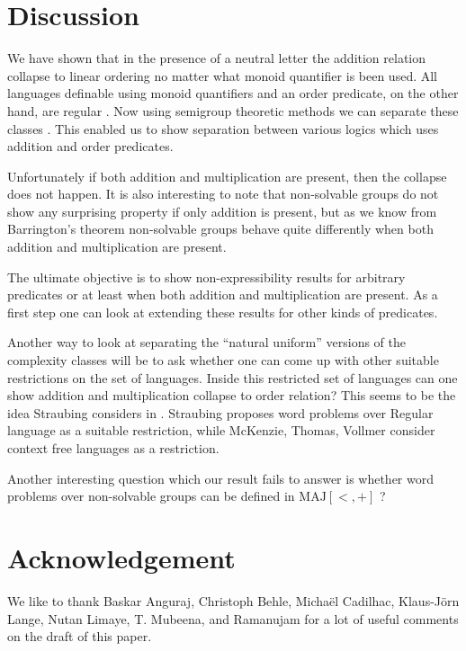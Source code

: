 \documentclass[envcountsame]{llncs}
\newcommand{\MAJ}{\mathrm{MAJ}}
\begin{document}
\bigskip


\bigskip
\section{Discussion}
We have shown that in the presence of a neutral letter the addition relation collapse to linear ordering no matter what monoid
quantifier is been used. All languages definable using monoid quantifiers and an order predicate, on the other hand, are regular \cite{barr_uniformNC1}. 
Now using semigroup theoretic methods we can separate these classes \cite{str_cirBook}. This enabled us to show separation between
various logics which uses addition and order predicates. 


Unfortunately if both addition and multiplication are present, then the collapse does not happen. It is also interesting to note that non-solvable
groups do not show any surprising property if only addition is present, but as we know from Barrington's theorem non-solvable groups
behave quite differently when both addition and multiplication are present.

The ultimate objective is to show non-expressibility results for arbitrary predicates or at least when both addition and multiplication
are present. As a first step one can look at extending these results for other kinds of predicates. 

Another way to look at separating the ``natural uniform'' versions of the complexity classes will be to ask whether one can come up
with other suitable restrictions on the set of languages. Inside this restricted set of languages can one show addition and
multiplication collapse to order relation? This seems to be the idea Straubing considers in \cite{str_inexpRegLan}. Straubing
\cite{str_cirBook} proposes word problems over Regular language as a suitable restriction, while McKenzie, Thomas, Vollmer \cite{mckenzie_extUniformity} consider context free languages as a restriction.

Another interesting question which our result fails to answer is whether word problems over non-solvable groups can be defined in
$\MAJ[<,+]$ \cite{krebs_infGroups}?
\section*{Acknowledgement}
\noindent We like to thank Baskar Anguraj, Christoph Behle, Micha\"el Cadilhac, Klaus-J\"orn Lange, Nutan Limaye, T. Mubeena, and Ramanujam for a lot of useful comments on the draft of this paper.
\end{document}
